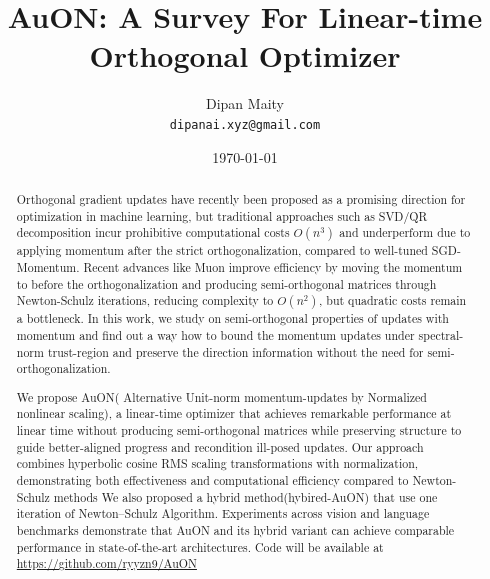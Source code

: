 \documentclass[12pt,a4paper]{article}
\title{ AuON: A Survey For Linear-time Orthogonal Optimizer }
\author{Dipan Maity \\
\texttt{dipanai.xyz@gmail.com}}
\date{\today}
\begin{document}
\maketitle

\begin{abstract}


\noindent Orthogonal gradient updates have recently been proposed as a promising direction for optimization in machine learning, but traditional approaches such as SVD/QR decomposition incur prohibitive computational costs 
\(O(n^3)\) and underperform due to applying momentum after the strict orthogonalization, compared to well-tuned SGD-Momentum. Recent advances like Muon improve efficiency by moving the momentum to before the orthogonalization and producing semi-orthogonal matrices through Newton-Schulz iterations, reducing complexity to \(O(n^2)\), but quadratic costs remain a bottleneck. In this work, we study on semi-orthogonal properties of updates with momentum
and find out a way how to bound the momentum updates under spectral-norm trust-region and preserve the direction information without the need for semi-orthogonalization.


We propose AuON( Alternative Unit-norm momentum-updates by Normalized nonlinear scaling), a linear-time optimizer  that achieves remarkable performance at linear time without producing semi-orthogonal matrices while preserving structure to guide better-aligned progress and recondition ill-posed updates. Our approach combines hyperbolic cosine RMS scaling transformations with normalization, demonstrating both effectiveness and computational efficiency compared to Newton-Schulz methods We also proposed a hybrid method(hybired-AuON) that use one iteration of  Newton–Schulz Algorithm. Experiments across vision and language benchmarks demonstrate that AuON and its hybrid variant  can achieve comparable performance in state-of-the-art architectures. 
Code will be available at \url{https://github.com/ryyzn9/AuON}
\end{abstract}

\end{document}
